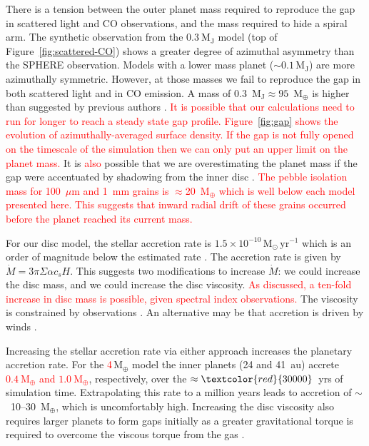 \documentclass[usenatbib,a4paper,times]{mnras}
\renewcommand{\sun}{\mathrm{M}_{\odot}}
\renewcommand{\earth}{\mathrm{M}_{\oplus}}
\newcommand{\new}[1]{{\textcolor{red}{#1}}}
\begin{document}
There is a tension between the outer planet mass required to reproduce the gap
in scattered light and CO observations, and the mass required to hide a spiral
arm. The synthetic observation from the $0.3~\mathrm{M_J}$ model (top of
Figure~\ref{fig:scattered-CO}) shows a greater degree of azimuthal asymmetry
than the SPHERE observation. Models with a lower mass planet ($\sim
0.1\,\mathrm{M_J}$) are more azimuthally symmetric. However, at those masses we
fail to reproduce the gap in both scattered light and in CO emission. A mass of
0.3~$\mathrm{M_J} \approx 95$~$\earth{}$ is higher than suggested by previous
authors \citep{dong:2017b, van-boekel:2017}. \new{It is possible that our
calculations need to run for longer to reach a steady state gap profile.
Figure~\ref{fig:gap} shows the evolution of azimuthally-averaged surface
density. If the gap is not fully opened on the timescale of the simulation then
we can only put an upper limit on the planet mass.} It is \new{also} possible
that we are overestimating the planet mass if the gap were accentuated by
shadowing from the inner disc \citep{debes:2013, debes:2017, poteet:2018}.
\new{The pebble isolation mass \citep{bitsch:2018} for 100~$\mu$m and 1~mm
grains is $\approx$20~$\earth{}$ which is well below each model presented here.
This suggests that inward radial drift of these grains occurred before the
planet reached its current mass.}

For our disc model, the stellar accretion rate is $1.5\times
10^{-10}\,\sun{}\,\mathrm{yr}^{-1}$ which is an order of magnitude below the
estimated rate \citep{brickhouse:2012}. The accretion rate is given by $\dot{M}
= 3\pi\Sigma\alpha c_s H$. This suggests two modifications to increase
$\dot{M}$: we could increase the disc mass, and we could increase the disc
viscosity. \new{As discussed, a ten-fold increase in disc mass is possible,
given spectral index observations.} The viscosity is constrained by observations
\citep{flaherty:2018}. An alternative may be that accretion is driven by winds
\citep{simon:2017a}.

Increasing the stellar accretion rate via either approach increases the
planetary accretion rate. For the \new{4}$\,\earth{}$ model the inner planets
(24 and 41~au) accrete \new{$0.4~\earth{}$ and $1.0~\earth{}$}, respectively,
over the $\approx\new{30000}$~yrs of simulation time. Extrapolating this rate
to a million years leads to accretion of $\sim$~10--30~$\earth{}$, which is
uncomfortably high. Increasing the disc viscosity also requires larger planets
to form gaps initially as a greater gravitational torque is required to overcome
the viscous torque from the gas \citep{dipierro:2016}.
\end{document}
